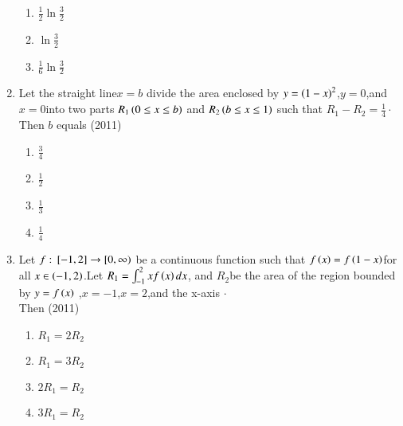 \documentclass[journal,12pt,twocolumn]{IEEEtran}
\theoremstyle{remark}
\begin{document}
\begin{enumerate}[start=21]
\begin{enumerate}
\item$\frac{1}{2}\ln\frac{3}{2}$
\item $\ln \frac{3}{2}$ 
\item $\frac{1}{6}\ln \frac{3}{2}$
\end{enumerate}
\item Let the straight line$x=b$ divide the area enclosed by $y=\left(1-x\right)^2$,$y=0$,and$x=0$into two parts $R_1 \left(0\leq x\leq b\right)$ and $R_2\left(b\leq x\leq 1\right)$ such that $R_1 -R_2 =\frac{1}{4}\cdot$Then  
$b$ equals
    \hfill{(2011)}
\begin{enumerate}
\item$\frac{3}{4}$
\item $\frac{1}{2}$
\item $\frac{1}{3}$
\item $\frac{1}{4}$
\end{enumerate}
\item Let $f:{}\left[-1,2\right]\to [0,\infty)$ be a continuous function such that $f\left(x\right)=f\left(1-x\right)$for all $x\in \left(-1,2\right)$.Let $R_1=\int_{-1}^{2}xf\left(x\right)dx$, and $R_2 $be the area of the region bounded by $y=f\left(x\right)$ ,$x=-1$,$x=2$,and the x-axis $\cdot$\\Then
\hfill{(2011)}
\begin{enumerate}
\item $R_1=2R_2$
\item $R_1=3R_2$
\item $2R_1=R_2$ 
\item $3R_1=R_2$
\end{enumerate}






\end{enumerate}
\end{document}
